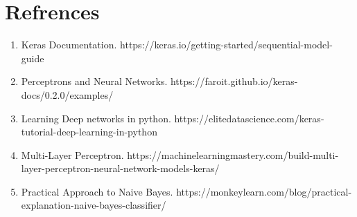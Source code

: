 \documentclass[fleqn,10pt]{SelfArx} %
\begin{document}
\section*{Refrences}
\begin{enumerate}
	\item Keras Documentation. https://keras.io/getting-started/sequential-model-guide
	\item Perceptrons and Neural Networks. https://faroit.github.io/keras-docs/0.2.0/examples/
	\item Learning Deep networks in python. https://elitedatascience.com/keras-tutorial-deep-learning-in-python
	\item Multi-Layer Perceptron. https://machinelearningmastery.com/build-multi-layer-perceptron-neural-network-models-keras/
	\item Practical Approach to Naive Bayes. https://monkeylearn.com/blog/practical-explanation-naive-bayes-classifier/
\end{enumerate}

\end{document}
